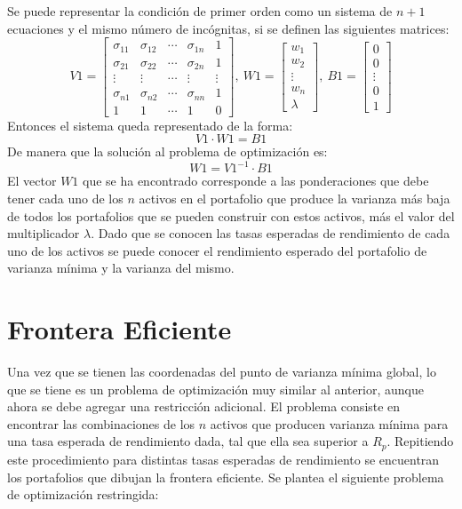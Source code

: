 \documentclass[12pt]{book} %
\begin{document}
Se puede representar la condición de primer orden como un sistema de $n+1$ ecuaciones y el mismo número de incógnitas, si se definen las siguientes matrices:
$$
V1=\begin{bmatrix}
 \sigma_{11}&\sigma_{12}  & \cdots & \sigma_{1n} & 1 \\ 
 \sigma_{21}&\sigma_{22}  & \cdots & \sigma_{2n} & 1 \\ 
\vdots &\vdots  & \cdots & \vdots & \vdots \\ 
 \sigma_{n1}&\sigma_{n2}  & \cdots & \sigma_{nn} & 1 \\ 
1 & 1 & \cdots & 1 & 0 
\end{bmatrix}, \ W1=\begin{bmatrix}
w_1\\ 
w_2\\ 
\vdots \\ 
w_n\\ 
\lambda
\end{bmatrix},\ B1=\begin{bmatrix}
0\\ 
0\\ 
\vdots \\ 
0\\ 
1
\end{bmatrix}
$$
Entonces el sistema queda representado de la forma:
$$V1\cdot W1=B1$$
De manera que la solución al problema de optimización es:
$$W1=V1^{-1} \cdot B1$$
El vector $W1$ que se ha encontrado corresponde a las ponderaciones que debe tener cada uno de los $n$ activos en el portafolio que produce la varianza más baja de todos los portafolios que se pueden construir con estos activos, más el valor del multiplicador $\lambda$. Dado que se conocen las tasas esperadas de rendimiento de cada uno de los activos se puede conocer el rendimiento esperado del portafolio de varianza mínima y la varianza del mismo.

\section{Frontera Eficiente}
Una vez que se tienen las coordenadas del punto de varianza mínima global, lo que se tiene es un problema de optimización muy similar al anterior, aunque ahora se debe agregar una restricción adicional. El problema consiste en encontrar las combinaciones de los $n$ activos que producen varianza mínima para una tasa esperada de rendimiento dada, tal que ella sea superior a $R_p$. Repitiendo este procedimiento para distintas tasas esperadas de rendimiento se encuentran los portafolios que dibujan la frontera eficiente.
Se plantea el siguiente problema de optimización restringida:
\end{document}
